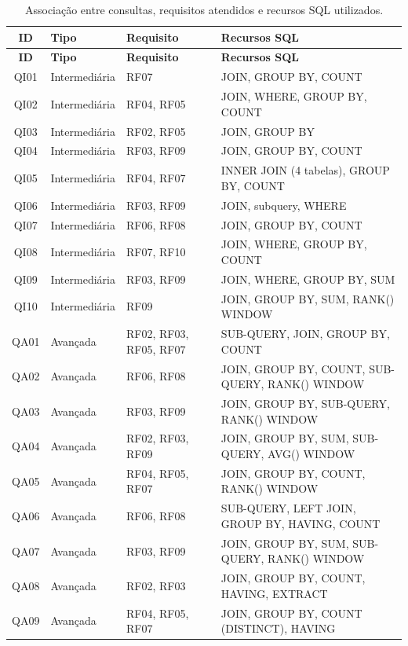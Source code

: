 \documentclass[12pt]{article}
\begin{document}
\small
\begin{longtable}{|c|l|l|p{6.5cm}|}
\caption{Associação entre consultas, requisitos atendidos e recursos SQL utilizados.}
\label{tab:consultas-req}\\
\hline
\textbf{ID} & \textbf{Tipo} & \textbf{Requisito} & \textbf{Recursos SQL} \\
\hline
\endfirsthead
\hline
\textbf{ID} & \textbf{Tipo} & \textbf{Requisito} & \textbf{Recursos SQL} \\
\hline
\endhead
QI01 & Intermediária & RF07 & JOIN, GROUP BY, COUNT \\
QI02 & Intermediária & RF04, RF05 & JOIN, WHERE, GROUP BY, COUNT \\
QI03 & Intermediária & RF02, RF05 & JOIN, GROUP BY \\
QI04 & Intermediária & RF03, RF09 & JOIN, GROUP BY, COUNT \\
QI05 & Intermediária & RF04, RF07 & INNER JOIN (4 tabelas), GROUP BY, COUNT \\
QI06 & Intermediária & RF03, RF09 & JOIN, subquery, WHERE \\
QI07 & Intermediária & RF06, RF08 & JOIN, GROUP BY, COUNT \\
QI08 & Intermediária & RF07, RF10 & JOIN, WHERE, GROUP BY, COUNT \\
QI09 & Intermediária & RF03, RF09 & JOIN, WHERE, GROUP BY, SUM \\
QI10 & Intermediária & RF09 & JOIN, GROUP BY, SUM, RANK() WINDOW \\
\hline
QA01 & Avançada & RF02, RF03, RF05, RF07 & SUB-QUERY, JOIN, GROUP BY, COUNT \\
QA02 & Avançada & RF06, RF08 & JOIN, GROUP BY, COUNT, SUB-QUERY, RANK() WINDOW \\
QA03 & Avançada & RF03, RF09 & JOIN, GROUP BY, SUB-QUERY, RANK() WINDOW \\
QA04 & Avançada & RF02, RF03, RF09 & JOIN, GROUP BY, SUM, SUB-QUERY, AVG() WINDOW \\
QA05 & Avançada & RF04, RF05, RF07 & JOIN, GROUP BY, COUNT, RANK() WINDOW \\
QA06 & Avançada & RF06, RF08 & SUB-QUERY, LEFT JOIN, GROUP BY, HAVING, COUNT \\
QA07 & Avançada & RF03, RF09 & JOIN, GROUP BY, SUM, SUB-QUERY, RANK() WINDOW \\
QA08 & Avançada & RF02, RF03 & JOIN, GROUP BY, COUNT, HAVING, EXTRACT \\
QA09 & Avançada & RF04, RF05, RF07 & JOIN, GROUP BY, COUNT (DISTINCT), HAVING \\

\end{longtable}
\end{document}
